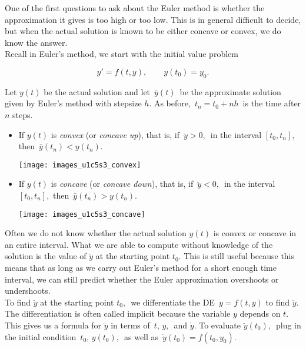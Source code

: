 \clearpage

One of the first questions to ask about the Euler method is
whether the approximation it gives is too high or too low.
This is in general difficult to decide,
but when the actual solution is known to be either concave or convex, we do know the answer. \\

Recall in Euler's method, we start with the initial value problem

\begin{equation*}
  y' = f(t,y), \qquad y(t_0) = y_0. 
\end{equation*}

Let $y(t)$ be the actual solution and let $\, \bar{y}(t)\,$
be the approximate solution given by Euler's method with stepsize $h$.
As before, $\, t_n = t_0 + nh \,$ is the time after $n$ steps.
\begin{itemize}
\item If $y(t)$ is \emph{convex} (or \emph{concave up}), that is,
  if $\, \ddot y > 0,\,$ in the interval $[t_0 , t_n],$ then
  $\, \bar{y}(t_ n)< y(t_ n)$.

  \texttt{[image: images\_u1c5s3\_convex]}

\item If $y(t)$ is \emph{concave} (or \emph{concave down}), that is,
  if $\, \ddot y < 0,\,$ in the interval $[t_0 , t_n],$ then
  $\, \bar{y}(t_ n) > y(t_ n)$.

  \texttt{[image: images\_u1c5s3\_concave]}
  
\end{itemize}

Often we do not know whether the actual solution $y(t)$ is convex or concave
in an entire interval.
What we are able to compute without knowledge of the solution is the value of $\ddot y$
at the starting point $t_0$.
This is still useful because this means that as long as we carry out Euler's method
for a short enough time interval,
we can still predict whether the Euler approximation overshoots or undershoots. \\

To find $\ddot y$ at the starting point $t_0,\,$
we differentiate the DE $\, \dot y = f(t,y)$ to find $\ddot y$.
The differentiation is often called implicit because the variable $y$ depends on $t$.
This gives us a formula for $\ddot y$ in terms of $\, t,\, y, \,$ and $\dot y$.
To evaluate $\ddot y(t_0),\,$ plug in the initial condition
$\, t_0,\, y(t_0),\,$ as well as $\, \dot y(t_0) = f(t_0,y_0)$.

\clearpage


